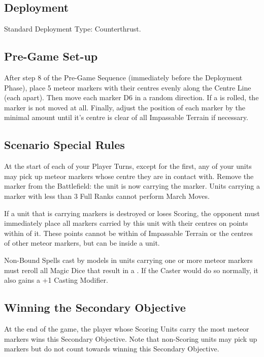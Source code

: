 
\label{MeteorShower}


\subsection*{Deployment}

Standard Deployment Type: Counterthrust.

\subsection*{Pre-Game Set-up}

After step 8 of the Pre-Game Sequence (immediately before the Deployment Phase), place 5 meteor markers with their centres evenly along the Centre Line (each  apart). Then move each marker D6\timess{} in a random direction. If a  is rolled, the marker is not moved at all. Finally, adjust the position of each marker by the minimal amount until it's centre is  clear of all Impassable Terrain if necessary.


\subsection*{Scenario Special Rules}

At the start of each of your Player Turns, except for the first, any of your units may pick up meteor markers whose centre they are in contact with. Remove the marker from the Battlefield: the unit is now carrying the marker. Units carrying a marker with less than 3 Full Ranks cannot perform March Moves.

If a unit that is carrying markers is destroyed or loses Scoring, the opponent must immediately place all markers carried by this unit with their centres on points within  of it. These points cannot be within  of Impassable Terrain or the centres of other meteor markers, but can be inside a unit.

Non-Bound Spells cast by models in units carrying one or more meteor markers must reroll all Magic Dice that result in a . If the Caster would do so normally, it also gains a +1 Casting Modifier.

\subsection*{Winning the Secondary Objective}

At the end of the game, the player whose Scoring Units carry the most meteor markers wins this Secondary Objective. Note that non-Scoring units may pick up markers but do not count towards winning this Secondary Objective.

